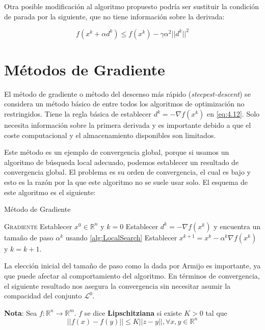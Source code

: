 Otra posible modificación al algoritmo propuesto podría ser sustituir la condición de parada por la siguiente, que no tiene información sobre la derivada:

\begin{equation}
f(x^k +\alpha d^k) \leq f(x^k)-\gamma\alpha^2||d^k||^2
\label{eq:4.16}
\end{equation}

\section{Métodos de Gradiente}

El método de gradiente o método del descenso más rápido (\textit{steepest-descent}) se considera un método básico de entre todos los algoritmos de optimización no restringidos. 
Tiene la regla básica de establecer $d^k = -\nabla f(x^k)$ en \ref{eq:4.12}. 
Solo necesita información sobre la primera derivada y es importante debido a que el coste computacional y el almacenamiento disponibles son limitados. 

Este método es un ejemplo de convergencia global, porque si usamos un algoritmo de búsqueda local adecuado, podemos establecer un resultado de convergencia global. 
El problema es su orden de convergencia, el cual es bajo y esto es la razón por la que este algoritmo no se suele usar solo. 
El esquema de este algoritmo es el siguiente:

\begin{algorithm}
\caption{Método de Gradiente}\label{alg:GradientMethod}
\begin{algorithmic}[1]
\Procedure \textsc{Gradiente}
\State Establecer $x^0\in\mathbb{R}^n$ y $k=0$
	\State Establecer $d^k=-\nabla f(x^k)$ y encuentra un tamaño de paso $\alpha^k$ usando \ref{alg:LocalSearch}
	\State Establecer $x^{k+1} = x^k - \alpha^k\nabla f(x^k)$ y $k=k+1$.
\EndWhile
\EndProcedure
\end{algorithmic}
\end{algorithm}

La elección inicial del tamaño de paso como la dada por Armijo es importante, ya que puede afectar al comportamiento del algoritmo. 
En términos de convergencia, el siguiente resultado nos asegura la convergencia sin necesitar asumir la compacidad del conjunto $\mathcal{L}^0$.

\textbf{Nota}: Sea $f:\mathbb{R}^n\xrightarrow{}{}\mathbb{R}^m$. $f$ se dice \textbf{Lipschitziana} si existe $K>0$ tal que
\begin{equation*}
||f(x)-f(y)|| \leq K||z-y||, \forall x,y\in\mathbb{R}^n
\end{equation*}

